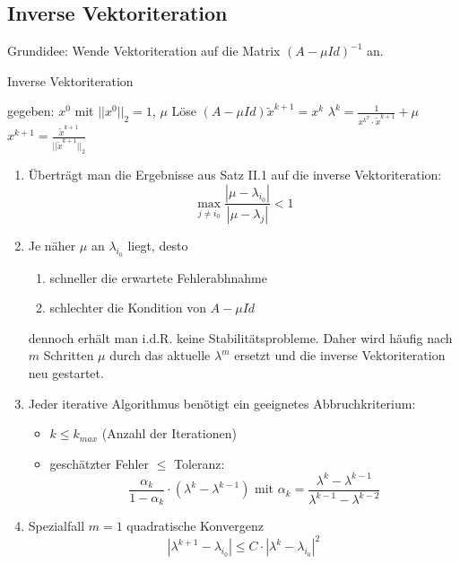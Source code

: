 \subsection{Inverse Vektoriteration}
Grundidee: Wende Vektoriteration auf die Matrix $(A-\mu Id)^{-1}$ an.
\begin{algorithm}
	\caption{Inverse Vektoriteration}
	\begin{algorithmic}
		\STATE gegeben: $x^{0}$ mit $||x^{0}||_{2}=1$, $\mu$
			\STATE Löse $(A-\mu Id)\tilde x^{k+1} = x^{k}$
			\STATE $\lambda^{k} = \frac{1}{x^{k^{T}}\cdot \tilde x^{k+1}} + \mu$
			\STATE $x^{k+1} = \frac{\tilde x^{k+1}}{||\tilde x^{k+1}||_{2}}$
		\ENDFOR
	\end{algorithmic}
\end{algorithm}

\begin{remark}
	\begin{enumerate}
		\item Überträgt man die Ergebnisse aus Satz II.1 auf die inverse Vektoriteration:
			$$\max_{j\not = i_{0}} \frac{|\mu - \lambda_{i_{0}}|}{|\mu - \lambda_{j}|} < 1$$
		\item Je näher $\mu$ an $\lambda_{i_{0}}$ liegt, desto
		\begin{enumerate}
			\item schneller die erwartete Fehlerabhnahme
			\item schlechter die Kondition von $A-\mu Id$
		\end{enumerate}
			dennoch erhält man i.d.R. keine Stabilitätsprobleme. Daher wird häufig nach $m$ Schritten $\mu$ durch das aktuelle
			$\lambda^{m}$ ersetzt und die inverse Vektoriteration neu gestartet.
		\item Jeder iterative Algorithmus benötigt ein geeignetes Abbruchkriterium:
		\begin{itemize}
			\item $k\leq k_{max}$ (Anzahl der Iterationen)
			\item geschätzter Fehler $\leq$ Toleranz:
			$$\frac{\alpha_{k}}{1-\alpha_{k}}\cdot (\lambda^{k}-\lambda^{k-1})\text{ mit } \alpha_{k}=\frac{\lambda^{k}-\lambda^{k-1}}{\lambda^{k-1}-\lambda^{k-2}}$$
		\end{itemize}
		\item Spezialfall $m=1$ quadratische Konvergenz
		$$|\lambda^{k+1}-\lambda_{i_{0}}|\leq C \cdot |\lambda^{k}-\lambda_{i_{0}}|^{2}$$
	\end{enumerate}
\end{remark}

